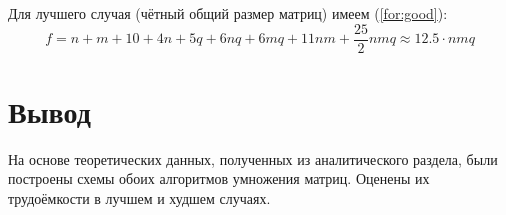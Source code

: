 Для лучшего случая (чётный общий размер матриц) имеем (\ref{for:good}):
\begin{equation}
    \label{for:good}
    f = n + m + 10 + 4n + 5q + 6nq + 6mq + 11nm + \frac{25}{2}nmq \approx 12.5 \cdot nmq
\end{equation}

\section*{Вывод}

На основе теоретических данных, полученных из аналитического раздела, были построены схемы обоих алгоритмов умножения матриц.  Оценены их трудоёмкости в лучшем и худшем случаях.
